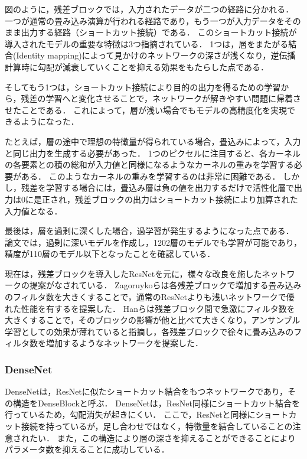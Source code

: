     図のように，残差ブロックでは，入力されたデータが二つの経路に分かれる．
    一つが通常の畳み込み演算が行われる経路であり，もう一つが入力データをそのまま出力する経路（ショートカット接続）である．
    このショートカット接続が導入されたモデルの重要な特徴は3つ指摘されている．
    1つは，層をまたがる結合(Identity mapping)によって見かけのネットワークの深さが浅くなり，逆伝播計算時に勾配が減衰していくことを抑える効果をもたらした点である．
    
    そしてもう1つは，ショートカット接続により目的の出力を得るための学習から，残差の学習へと変化させることで，ネットワークが解きやすい問題に帰着させたことである．
    これによって，層が浅い場合でもモデルの高精度化を実現できるようになった．

    たとえば，層の途中で理想の特徴量が得られている場合，畳込みによって，入力と同じ出力を生成する必要があった．
    1つのピクセルに注目すると、各カーネルの各要素との積の総和が入力値と同様になるようなカーネルの重みを学習する必要がある．
    このようなカーネルの重みを学習するのは非常に困難である．
    しかし，残差を学習する場合には，畳込み層は負の値を出力するだけで活性化層で出力は0に是正され，残差ブロックの出力はショートカット接続により加算された入力値となる．
    
    最後は，層を過剰に深くした場合，過学習が発生するようになった点である．
    論文では，過剰に深いモデルを作成し，1202層のモデルでも学習が可能であり，精度が110層のモデル以下となったことを確認している．
    
     現在は，残差ブロックを導入したResNetを元に，様々な改良を施したネットワークの提案がなされている．
     Zagoruykoら\cite{zagoruyko2016wide}は各残差ブロックで増加する畳み込みのフィルタ数を大きくすることで，通常のResNetよりも浅いネットワークで優れた性能を有するを提案した．
     Hanら\cite{han2017deep}は残差ブロック間で急激にフィルタ数を大きくすることで，そのブロックの影響が他と比べて大きくなり，アンサンブル学習としての効果が薄れていると指摘し，各残差ブロックで徐々に畳み込みのフィルタ数を増加するようなネットワークを提案した．

\subsubsection{DenseNet}
    DenseNet\cite{huang2017densely}は，ResNetに似たショートカット結合をもつネットワークであり，その構造をDenseBlockと呼ぶ．
    DenseNetは，ResNet同様にショートカット結合を行っているため，勾配消失が起きにくい．
    ここで，ResNetと同様にショートカット接続を持っているが，足し合わせではなく，特徴量を結合していることの注意されたい．
    また，この構造により層の深さを抑えることができることによりパラメータ数を抑えることに成功している．
    
